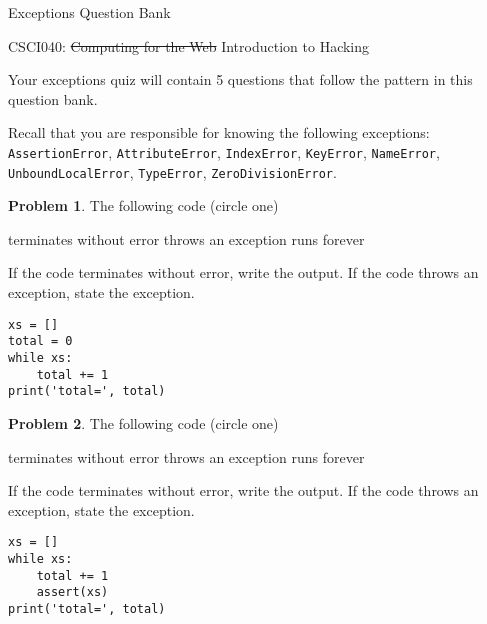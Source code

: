 \documentclass[10pt]{article}
\theoremstyle{definition}
\newtheorem{problem}{Problem}
\begin{document}
\begin{center}
    {
\Large
    Exceptions Question Bank
}

    \vspace{0.1in}
    CSCI040: \sout{Computing for the Web} Introduction to Hacking

    \vspace{0.1in}
\end{center}


\noindent
Your exceptions quiz will contain 5 questions that follow the pattern in this question bank.

\vspace{0.25in}
\noindent
Recall that you are responsible for knowing the following exceptions:
\lstinline{AssertionError},
\lstinline{AttributeError},
\lstinline{IndexError},
\lstinline{KeyError},
\lstinline{NameError},
\lstinline{UnboundLocalError},
\lstinline{TypeError},
\lstinline{ZeroDivisionError}.
\vspace{0.25in}

\begin{problem}
    The following code (circle one)

    \vspace{0.25in}
    \hspace{0.5in}terminates without error 
    \hspace{1in}throws an exception
    \hspace{1in}runs forever
    \vspace{0.25in}

    \noindent
    If the code terminates without error, write the output.
    If the code throws an exception, state the exception.
\end{problem}
\begin{lstlisting}
xs = []
total = 0
while xs:
    total += 1
print('total=', total)
\end{lstlisting}
\vspace{1in}


\begin{problem}
    The following code (circle one)

    \vspace{0.25in}
    \hspace{0.5in}terminates without error 
    \hspace{1in}throws an exception
    \hspace{1in}runs forever
    \vspace{0.25in}

    \noindent
    If the code terminates without error, write the output.
    If the code throws an exception, state the exception.
\end{problem}
\begin{lstlisting}
xs = []
while xs:
    total += 1
    assert(xs)
print('total=', total)
\end{lstlisting}
\vspace{1in}
\end{document}
